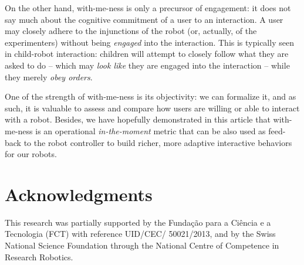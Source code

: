 \documentclass{sig-alternate}
\begin{document}
On the other hand, with-me-ness is only a precursor of engagement: it
does not say much about the cognitive commitment of a user to an interaction. A
user may closely adhere to the injunctions of the robot (or, actually, of the
experimenters) without being \emph{engaged} into the interaction. This is
typically seen in child-robot interaction: children will attempt to closely
follow what they are asked to do -- which may \emph{look like} they are engaged
into the interaction -- while they merely \emph{obey orders}.

One of the strength of with-me-ness is its objectivity: we can formalize it, and
as such, it is valuable to assess and compare how users are willing or able to
interact with a robot. Besides, we have hopefully demonstrated in this article
that with-me-ness is an operational \emph{in-the-moment} metric that can be also
used as feed-back to the robot controller to build richer, more adaptive
interactive behaviors for our robots.

\section*{Acknowledgments}

This research was partially supported by the Funda\c{c}\~{a}o para a Ci\^{e}ncia
e a Tecnologia (FCT) with reference UID/CEC/ 50021/2013, and by the Swiss
National Science Foundation through the National Centre of Competence in
Research Robotics.



\end{document}
